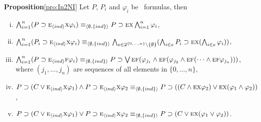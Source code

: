 \documentclass[letterpaper]{article} %
\begin{document}
\noindent\textbf{Proposition}\ref{pro:In2NI}
Let $P$, $P_i$ and $\varphi_i$ be \CTL\ formulas, then
\begin{enumerate}[(i)]
  \item $\bigwedge_{i=1}^n (P\supset \textsc{e}_{{\langle{ind}\rangle}} \textsc{x} \varphi_i)  \equiv_{{\langle{\emptyset, \{ind\}}\rangle}} P\supset \textsc{e} \textsc{x} \bigwedge_{i=1}^n \varphi_i$,
  \item $\bigwedge_{i=1}^n (P_i\supset \textsc{e}_{{\langle{ind}\rangle}} \textsc{x} \varphi_i) \equiv_{{\langle{\emptyset, \{ind\}}\rangle}} \bigwedge_{e \in 2^{\{0,\dots, n\}} \setminus \{\emptyset\}}(\bigwedge_{i\in e}P_i\supset \textsc{e} \textsc{x} (\bigwedge_{i\in e}\varphi_i))$,
  \item $\bigwedge_{i=1}^n (P\supset \textsc{e}_{{\langle{ind}\rangle}} \textsc{f} \varphi_i)  \equiv_{{\langle{\emptyset, \{ind\}}\rangle}} P\supset \bigvee\textsc{e}\textsc{f} (\varphi_{j_1} \wedge \textsc{e}\textsc{f}(\varphi_{j_2} \wedge \textsc{e}\textsc{f}(\dots \wedge \textsc{e}\textsc{f} \varphi_{j_n})))$, where $(j_1, \dots, j_n)$ are sequences of all elements in $\{0, \dots, n\}$,
  \item $P\supset (C \vee \textsc{e}_{{\langle{ind}\rangle}} \textsc{x} \varphi_1) \wedge P \supset \textsc{e}_{{\langle{ind}\rangle}} \textsc{x} \varphi_2 \equiv_{{\langle{\emptyset, \{ind\}}\rangle}} P \supset ((C \wedge \textsc{e} \textsc{x} \varphi_2) \vee \textsc{e} \textsc{x} (\varphi_1 \wedge \varphi_2))$,
  \item $P\supset (C \vee \textsc{e}_{{\langle{ind}\rangle}} \textsc{x} \varphi_1) \vee P \supset \textsc{e}_{{\langle{ind}\rangle}} \textsc{x} \varphi_2 \equiv_{{\langle{\emptyset, \{ind\}}\rangle}} P \supset (C \vee \textsc{e} \textsc{x} (\varphi_1 \vee \varphi_2))$.
\end{enumerate}
\end{document}
